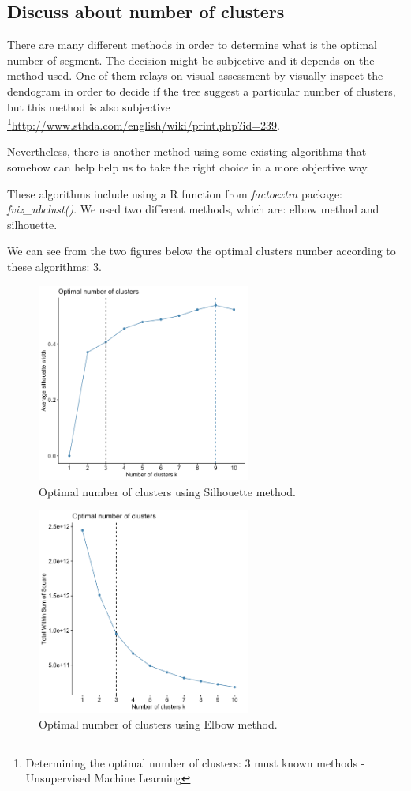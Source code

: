 \newpage
\subsection{Discuss about number of clusters}

There are many different methods in order to determine what is the optimal number of segment. The decision might be subjective and it depends on the method used. One of them relays on visual assessment by visually inspect the dendogram in order to decide if the tree suggest a particular number of clusters, but this method is also subjective \footnote{Determining the optimal number of clusters: 3 must known methods - Unsupervised Machine Learning}{\url{http://www.sthda.com/english/wiki/print.php?id=239}}.

Nevertheless, there is another method using some existing algorithms that somehow can help help us to take the right choice in a more objective way.

These algorithms include using a R function from \emph{factoextra}
package: \emph{fviz\_nbclust()}.
We used two different methods, which are: elbow method and silhouette.

We can see from the two figures below the optimal clusters number according to these algorithms: 3.

\begin{figure}[ht]
  \centering
  \includegraphics[width= 7cm]{images/ClusterPlot2.png}
  \caption{Optimal number of clusters using Silhouette method.}
  \label{fig:indiv}
\end{figure}

\begin{figure}
  \centering
  \includegraphics[width= 7cm]{images/ClusterPlot1.png}
  \caption{Optimal number of clusters using Elbow method.}
  \label{fig:indiv}
\end{figure}


